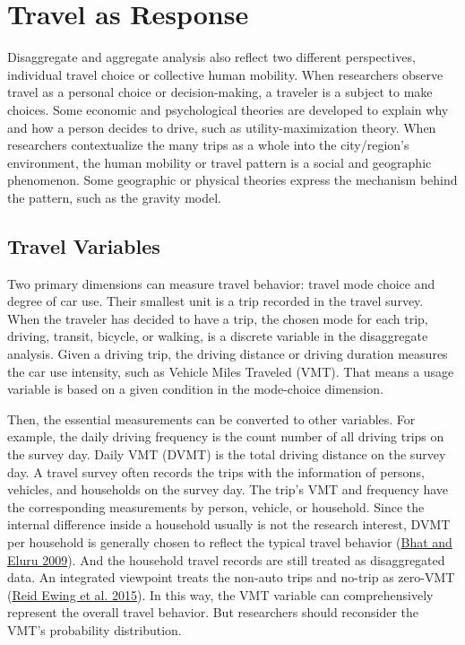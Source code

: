\documentclass[
  12pt,
]{article}
\begin{document}
\hypertarget{travel}{%
\section{Travel as Response}\label{travel}}

Disaggregate and aggregate analysis also reflect two different perspectives, individual travel choice or collective human mobility. When researchers observe travel as a personal choice or decision-making, a traveler is a subject to make choices. Some economic and psychological theories are developed to explain why and how a person decides to drive, such as utility-maximization theory. When researchers contextualize the many trips as a whole into the city/region's environment, the human mobility or travel pattern is a social and geographic phenomenon. Some geographic or physical theories express the mechanism behind the pattern, such as the gravity model.

\hypertarget{travel-variables}{%
\subsection{Travel Variables}\label{travel-variables}}

Two primary dimensions can measure travel behavior: travel mode choice and degree of car use. Their smallest unit is a trip recorded in the travel survey. When the traveler has decided to have a trip, the chosen mode for each trip, driving, transit, bicycle, or walking, is a discrete variable in the disaggregate analysis. Given a driving trip, the driving distance or driving duration measures the car use intensity, such as Vehicle Miles Traveled (VMT). That means a usage variable is based on a given condition in the mode-choice dimension.

Then, the essential measurements can be converted to other variables. For example, the daily driving frequency is the count number of all driving trips on the survey day. Daily VMT (DVMT) is the total driving distance on the survey day. A travel survey often records the trips with the information of persons, vehicles, and households on the survey day. The trip's VMT and frequency have the corresponding measurements by person, vehicle, or household. Since the internal difference inside a household usually is not the research interest, DVMT per household is generally chosen to reflect the typical travel behavior (\protect\hyperlink{ref-bhatCopulabasedApproachAccommodate2009}{Bhat and Eluru 2009}). And the household travel records are still treated as disaggregated data. An integrated viewpoint treats the non-auto trips and no-trip as zero-VMT (\protect\hyperlink{ref-ewingVaryingInfluencesBuilt2015}{Reid Ewing et al. 2015}). In this way, the VMT variable can comprehensively represent the overall travel behavior. But researchers should reconsider the VMT's probability distribution.
\end{document}
